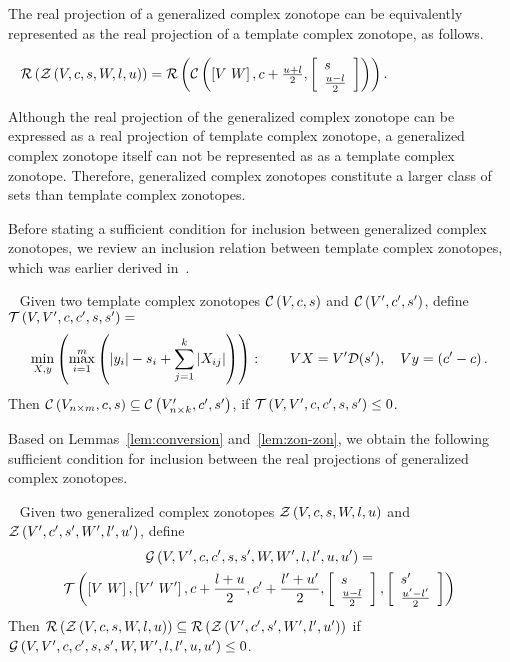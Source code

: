


The real projection of a generalized complex zonotope can be
equivalently represented as the real projection of a template complex
zonotope, as follows.  
\begin{lemma}~\label{lem:conversion}
$\mathcal{R}\left(\mathcal{Z}\left(V,c,s,W,l,u\right)\right) = \mathcal{R}\left(\mathcal{C}\left(\left[V~W\right],c+\frac{u+l}{2},\left[\begin{array}{l}{s}\\{\frac{u-l}{2}} \end{array}\right]\right)\right)$.
\end{lemma}
Although the real projection of the generalized complex zonotope can
be expressed as a real projection of template complex zonotope, a
generalized complex zonotope itself can not be represented as as a
template complex zonotope.  Therefore, generalized complex zonotopes
constitute a larger class of sets than template complex zonotopes.

Before stating a sufficient condition for inclusion between generalized complex
zonotopes, we review an inclusion relation between template complex
zonotopes, which was earlier derived in~\cite{todo}.
\begin{lemma}~\label{lem:zon-zon} Given two template complex zonotopes
  $\mathcal{C}\left(V,c,s\right)$ and $\mathcal{C}\left(V^\prime,c^\prime,s^\prime\right)$, define
  $\mathcal{T}\left(V,V^\prime,c,c^\prime,s,s^\prime\right) = $
\begin{align}
\begin{split}
\min_{X,y}\left(\max_{i=1}^m\left(\left|y_i\right|-s_i+\sum_{j=1}^{k}\left|X_{ij}\right|\right)\right):~~~~~~VX
= V^\prime\mathcal{D}(s^\prime),~~~Vy = \left(c^\prime-c\right).\\
\end{split}
\end{align}
Then $\mathcal{C}\left(V_{n\times m},c,s\right)\subseteq \mathcal{C}\left(V_{n\times
    k}^\prime,c^\prime,s^\prime\right)$, if $\mathcal{T}\left(V,V^\prime,c,c^\prime,s,s^\prime\right)\leq
0$.
\end{lemma}

Based on Lemmas~\ref{lem:conversion} and~\ref{lem:zon-zon}, we obtain
the following sufficient condition for inclusion between the real
projections of generalized complex zonotopes.
\begin{lemma}~\label{lem:gcz-gcz}
Given two generalized complex zonotopes $\mathcal{Z}\left(V,c,s,W,l,u\right)$ and
$\mathcal{Z}\left(V^\prime,c^\prime,s^\prime,W^\prime,l^\prime,u^\prime\right)$, define 
\begin{multline}
\mathcal{G}\left(V,V^\prime,c,c^\prime,s,s^\prime,W,W^\prime,l,l^\prime,u,u^\prime\right) = \\
\mathcal{T}\left(\left[V~W\right],\left[V^\prime~W^\prime\right],c+\frac{l+u}{2},c^\prime+\frac{l^\prime+u^\prime}{2},\left[\begin{array}{l}{s}\\{\frac{u-l}{2}} \end{array}\right],\left[\begin{array}{l}{s^\prime}\\{\frac{u^\prime-l^\prime}{2}} \end{array}\right]\right)
\end{multline}
Then  $\mathcal{R}\left(\mathcal{Z}\left(V,c,s,W,l,u\right)\right) \subseteq
\mathcal{R}\left(\mathcal{Z}\left(V^\prime,c^\prime,s^\prime,W^\prime,l^\prime,u^\prime\right)\right)$ if\\
$\mathcal{G}\left(V,V^\prime,c,c^\prime,s,s^\prime,W,W^\prime,l,l^\prime,u,u^\prime\right)\leq 0$.
\end{lemma}

